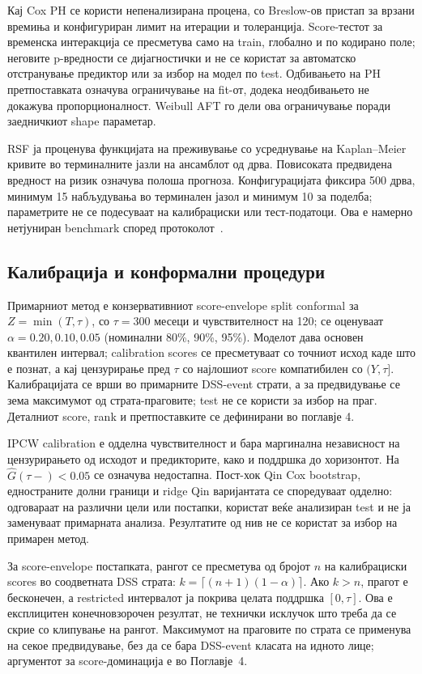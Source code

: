 \documentclass[12pt]{article}
\begin{document}
Кај Cox PH се користи непенализирана процена, со Breslow-ов пристап за врзани
времиња и конфигуриран лимит на итерации и толеранција. Score-тестот за временска
интеракција се пресметува само на train, глобално и по кодирано поле; неговите
p-вредности се дијагностички и не се користат за автоматско отстранување
предиктор или за избор на модел по test. Одбивањето на PH претпоставката
означува ограничување на fit-от, додека неодбивањето не докажува пропорционалност.
Weibull AFT го дели ова ограничување поради заедничкиот shape параметар.

RSF ја проценува функцијата на преживување со усреднување на Kaplan--Meier
кривите во терминалните јазли на ансамблот од дрва. Повисоката предвидена
вредност на ризик означува полоша прогноза. Конфигурацијата фиксира 500 дрва,
минимум 15 набљудувања во терминален јазол и минимум 10 за поделба; параметрите
не се подесуваат на калибрациски или тест-податоци. Ова е намерно нетјуниран
benchmark според протоколот~\cite{cox1972}.

\subsection{Калибрација и конформални процедури}

Примарниот метод е конзервативниот score-envelope split conformal за
$Z=\min(T,\tau)$, со $\tau=300$ месеци и чувствителност на 120; се оценуваат
$\alpha=0.20,0.10,0.05$ (номинални 80\%, 90\%, 95\%). Моделот дава основен
квантилен интервал; calibration scores се пресметуваат со точниот исход каде што
е познат, а кај цензурирање пред $\tau$ со најлошиот score компатибилен со
$(Y,\tau]$. Калибрацијата се врши во примарните DSS-event страти, а за
предвидување се зема максимумот од страта-праговите; test не се користи за
избор на праг. Деталниот score, rank и претпоставките се дефинирани во поглавје 4.

IPCW calibration е одделна чувствителност и бара маргинална независност на
цензурирањето од исходот и предикторите, како и поддршка до хоризонтот. На
$\widehat G(\tau-)<0.05$ се означува недостапна. Пост-хок Qin Cox bootstrap,
едностраните долни граници и ridge Qin варијантата се споредуваат одделно:
одговараат на различни цели или постапки, користат веќе анализиран test и не ја
заменуваат примарната анализа. Резултатите од нив не се користат за избор на
примарен метод.

За score-envelope постапката, рангот се пресметува од бројот $n$ на
калибрациски scores во соодветната DSS страта:
$k=\lceil(n+1)(1-\alpha)\rceil$. Ако $k>n$, прагот е бесконечен, а restricted
интервалот ја покрива целата поддршка $[0,\tau]$. Ова е експлицитен
конечновзорочен резултат, не технички исклучок што треба да се скрие со
клипување на рангот. Максимумот на праговите по страта се применува на секое
предвидување, без да се бара DSS-event класата на идното лице; аргументот за
score-доминација е во Поглавје~4.
\end{document}
